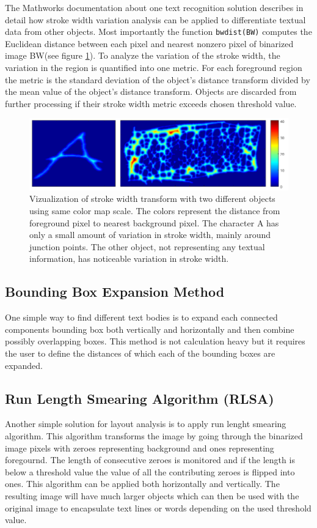 \documentclass{article}
\def\code#1{\texttt{#1}}
\begin{document}
          The Mathworks documentation about one text recognition solution describes in detail how stroke width variation analysis can be applied to differentiate textual data from other objects. \cite{MathworksTextRecognition} Most importantly the function \code{bwdist(BW)} computes the Euclidean distance between each pixel and nearest nonzero pixel of binarized image BW(see figure \ref{fig:strokewidth}). To analyze the variation of the stroke width, the variation in the region is quantified into one metric. For each foreground region the metric is the standard deviation of the object's distance transform divided by the mean value of the object's distance transform. Objects are discarded from further processing if their stroke width metric exceeds chosen threshold value.

          \begin{figure}
            \centering
            \includegraphics[natwidth=863,natheight=239,scale=0.5]{strokecomparison.png}
            \caption{Vizualization of stroke width transform with two different objects using same color map scale. The colors represent the distance from foreground pixel to nearest background pixel. The character A has only a small amount of variation in stroke width, mainly around junction points. The other object, not representing any textual information, has noticeable variation in stroke width. \label{fig:strokewidth} }
          \end{figure}

        \subsection{Bounding Box Expansion Method}
          One simple way to find different text bodies is to expand each connected components bounding box both vertically and horizontally and then combine possibly overlapping boxes. This method is not calculation heavy but it requires the user to define the distances of which each of the bounding boxes are expanded.

        \subsection{Run Length Smearing Algorithm (RLSA)}
          Another simple solution for layout analysis is to apply run lenght smearing algorithm. This algorithm transforms the image by going through the binarized image pixels with zeroes representing background and ones representing foregournd. The length of consecutive zeroes is monitored and if the length is below a threshold value the value of all the contributing zeroes is flipped into ones. This algorithm can be applied both horizontally and vertically. The resulting image will have much larger objects which can then be used with the original image to encapsulate text lines or words depending on the used threshold value.
\end{document}
